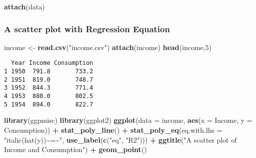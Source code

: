 \documentclass[
]{article}
\newenvironment{Shaded}{\begin{snugshade}}{\end{snugshade}}
\newcommand{\AttributeTok}[1]{\textcolor[rgb]{0.13,0.29,0.53}{#1}}
\newcommand{\DecValTok}[1]{\textcolor[rgb]{0.00,0.00,0.81}{#1}}
\newcommand{\FunctionTok}[1]{\textcolor[rgb]{0.13,0.29,0.53}{\textbf{#1}}}
\newcommand{\NormalTok}[1]{#1}
\newcommand{\OtherTok}[1]{\textcolor[rgb]{0.56,0.35,0.01}{#1}}
\newcommand{\SpecialCharTok}[1]{\textcolor[rgb]{0.81,0.36,0.00}{\textbf{#1}}}
\newcommand{\StringTok}[1]{\textcolor[rgb]{0.31,0.60,0.02}{#1}}
\begin{document}
\begin{Shaded}
\begin{Highlighting}[]
\FunctionTok{attach}\NormalTok{(data)}
\end{Highlighting}
\end{Shaded}

\hypertarget{a-scatter-plot-with-regression-equation}{%
\subsubsection{A scatter plot with Regression
Equation}\label{a-scatter-plot-with-regression-equation}}

\begin{Shaded}
\begin{Highlighting}[]
\NormalTok{income }\OtherTok{\textless{}{-}} \FunctionTok{read.csv}\NormalTok{(}\StringTok{"income.csv"}\NormalTok{)}
\FunctionTok{attach}\NormalTok{(income)}
\FunctionTok{head}\NormalTok{(income,}\DecValTok{5}\NormalTok{)}
\end{Highlighting}
\end{Shaded}

\begin{verbatim}
  Year Income Consumption
1 1950  791.8       733.2
2 1951  819.0       748.7
3 1952  844.3       771.4
4 1953  880.0       802.5
5 1954  894.0       822.7
\end{verbatim}

\begin{Shaded}
\begin{Highlighting}[]
\FunctionTok{library}\NormalTok{(ggpmisc)}
\FunctionTok{library}\NormalTok{(ggplot2)}
\FunctionTok{ggplot}\NormalTok{(}\AttributeTok{data =}\NormalTok{ income, }\FunctionTok{aes}\NormalTok{(}\AttributeTok{x =}\NormalTok{ Income, }\AttributeTok{y =}\NormalTok{ Consumption)) }\SpecialCharTok{+}
  \FunctionTok{stat\_poly\_line}\NormalTok{() }\SpecialCharTok{+}
  \FunctionTok{stat\_poly\_eq}\NormalTok{(}\AttributeTok{eq.with.lhs =} \StringTok{"italic(hat(y))\textasciitilde{}\textasciigrave{}=\textasciigrave{}\textasciitilde{}"}\NormalTok{,}
               \FunctionTok{use\_label}\NormalTok{(}\FunctionTok{c}\NormalTok{(}\StringTok{"eq"}\NormalTok{, }\StringTok{"R2"}\NormalTok{))) }\SpecialCharTok{+}
  \FunctionTok{ggtitle}\NormalTok{(}\StringTok{"A scatter plot of Income and Consumption"}\NormalTok{) }\SpecialCharTok{+}
  \FunctionTok{geom\_point}\NormalTok{()}
\end{Highlighting}
\end{Shaded}
\end{document}
